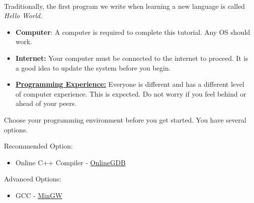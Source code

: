 \documentclass[12pt]{article}
\begin{document}
\begin{description}[labelindent=1cm]
	
	\item[\textbf{\underline{Overview:}}] \hfill \vspace{3mm}\\
	Traditionally, the first program we write when learning a new language is called {\it Hello World}.
	
	\item[\textbf{\underline{System Requirements:}}] \hfill \vspace{0mm}

\begin{itemize}
	\item {\bf Computer}: A computer is required to complete this tutorial. Any OS should work.
	\item {\bf Internet:} Your computer must be connected to the internet to proceed. It is a good idea to update the system before you begin. 
\end{itemize}

	\item[\textbf{\underline{Disclaimer:}}] \hfill \vspace{0mm}
	
	\begin{itemize}

		\item {\GR\underline{\bf Programming Experience:}} Everyone is different and has a different level of computer experience. This is expected. Do not worry if you feel behind or ahead of your peers.
		 
	\end{itemize}

\item[\textbf{\underline{Part 1 - Programming Environment:}}] \hfill \vspace{0mm}

Choose your programming environment before you get started. You have several options.

Recommended Option:

\begin{itemize}

	\item Online C++ Compiler - \href{https://www.onlinegdb.com/online\_c++\_compiler}{OnlineGDB} 

\end{itemize}	 
	Advanced Options:
\begin{itemize}
	\item GCC - \href{https://sourceforge.net/projects/mingw/}{MinGW}
		

\end{itemize}
\end{description}
\end{document}
